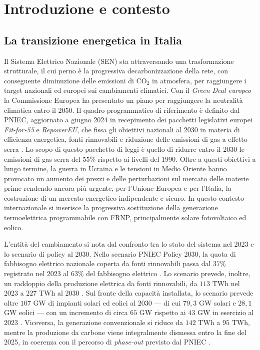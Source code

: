 \chapter{Introduzione e contesto}
\label{cap:introduzione}

\section{La transizione energetica in Italia}
\label{sec:transizione}

Il Sistema Elettrico Nazionale (SEN) sta attraversando una trasformazione strutturale, il cui perno è la progressiva decarbonizzazione della rete, con conseguente diminuzione delle emissioni di CO$_2$ in atmosfera, per raggiungere i target nazionali ed europei sui cambiamenti climatici. Con il \emph{Green Deal europeo} la Commissione Europea ha presentato un piano per raggiungere la neutralità climatica entro il 2050. Il quadro programmatico di riferimento è definito dal \ac{PNIEC}, aggiornato a giugno 2024 in recepimento dei pacchetti legislativi europei \emph{Fit-for-55} e \emph{RepowerEU}, che fissa gli obiettivi nazionali al 2030 in materia di efficienza energetica, fonti rinnovabili e riduzione delle emissioni di gas a effetto serra \cite{pniec2024}. Lo scopo di questo pacchetto di leggi è quello di ridurre entro il 2030 le emissioni di gas serra del $55\%$ rispetto ai livelli del 1990. Oltre a questi obiettivi a lungo termine, la guerra in Ucraina e le tensioni in Medio Oriente hanno provocato un aumento dei prezzi e delle perturbazioni sul mercato delle materie prime rendendo ancora più urgente, per l'Unione Europea e per l'Italia, la costruzione di un mercato energetico indipendente e sicuro. In questo contesto internazionale si inserisce la progressiva sostituzione della generazione termoelettrica programmabile con \ac{FRNP}, principalmente solare fotovoltaico ed eolico.  

L'entità del cambiamento si nota dal confronto tra lo stato del sistema nel 2023 e lo scenario di policy al 2030. Nello scenario \ac{PNIEC} Policy 2030, la quota di fabbisogno elettrico nazionale coperta da fonti rinnovabili passa dal $37 \%$ registrato nel 2023 al $63 \%$ del fabbisogno elettrico \cite{terna2025pds, dds2024}. Lo scenario prevede, inoltre, un raddoppio della produzione elettrica da fonti rinnovabili, da $113$ TWh nel 2023 a $227$ TWh al 2030 \cite{terna2025pds}. 
Sul fronte della capacità installata, lo scenario prevede oltre $107$ GW di impianti solari ed eolici al 2030 — di cui $79,3$ GW solari e $28,1$ GW eolici — con un incremento di circa $65$ GW rispetto ai $43$ GW in esercizio al 2023 \cite{terna2025pds}. Viceversa, la generazione convenzionale si riduce da $142$ TWh a $95$ TWh, mentre la produzione da carbone viene integralmente dismessa entro la fine del 2025, in coerenza con il percorso di \emph{phase-out} previsto dal \ac{PNIEC} \cite{terna2025pds, dds2024}.

